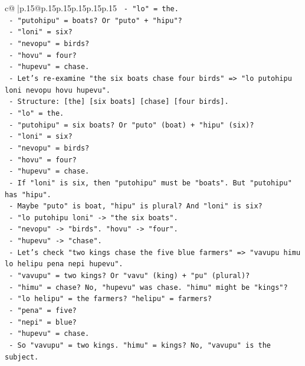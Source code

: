 \documentclass{article}
\begin{document}
{\begin{supertabular}{c@{$\;$}|p{.15\linewidth}@{}p{.15\linewidth}p{.15\linewidth}p{.15\linewidth}p{.15\linewidth}p{.15\linewidth}}
{{{\texttt{  {-} "lo" = the.} \\
\texttt{  {-} "putohipu" = boats? Or "puto" + "hipu"?} \\
\texttt{  {-} "loni" = six?} \\
\texttt{  {-} "nevopu" = birds?} \\
\texttt{  {-} "hovu" = four?} \\
\texttt{  {-} "hupevu" = chase.} \\
\texttt{  {-} Let's re{-}examine "the six boats chase four birds" => "lo putohipu loni nevopu hovu hupevu".} \\
\texttt{    {-} Structure: {[}the{]} {[}six boats{]} {[}chase{]} {[}four birds{]}.} \\
\texttt{    {-} "lo" = the.} \\
\texttt{    {-} "putohipu" = six boats? Or "puto" (boat) + "hipu" (six)?} \\
\texttt{    {-} "loni" = six?} \\
\texttt{    {-} "nevopu" = birds?} \\
\texttt{    {-} "hovu" = four?} \\
\texttt{    {-} "hupevu" = chase.} \\
\texttt{    {-} If "loni" is six, then "putohipu" must be "boats". But "putohipu" has "hipu".} \\
\texttt{    {-} Maybe "puto" is boat, "hipu" is plural? And "loni" is six?} \\
\texttt{    {-} "lo putohipu loni" {-}> "the six boats".} \\
\texttt{    {-} "nevopu" {-}> "birds". "hovu" {-}> "four".} \\
\texttt{    {-} "hupevu" {-}> "chase".} \\
\texttt{    {-} Let's check "two kings chase the five blue farmers" => "vavupu himu lo helipu pena nepi hupevu".} \\
\texttt{      {-} "vavupu" = two kings? Or "vavu" (king) + "pu" (plural)?} \\
\texttt{      {-} "himu" = chase? No, "hupevu" was chase. "himu" might be "kings"?} \\
\texttt{      {-} "lo helipu" = the farmers? "helipu" = farmers?} \\
\texttt{      {-} "pena" = five?} \\
\texttt{      {-} "nepi" = blue?} \\
\texttt{      {-} "hupevu" = chase.} \\
\texttt{      {-} So "vavupu" = two kings. "himu" = kings? No, "vavupu" is the subject.} \\
}}}
\end{supertabular}}
\end{document}
